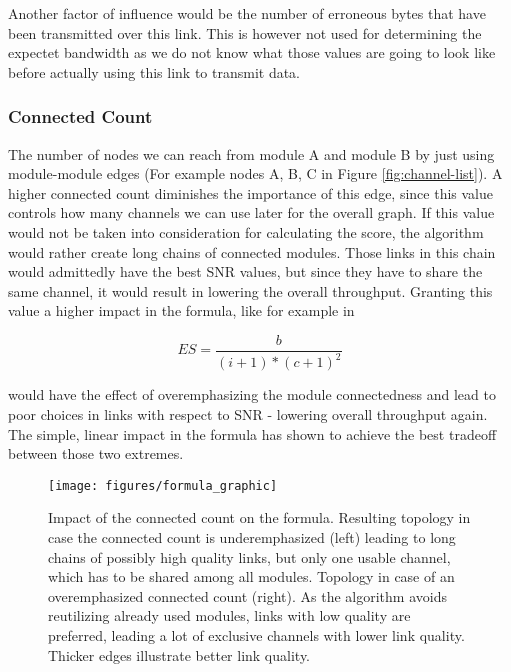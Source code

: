 	Another factor of influence would be the number of erroneous bytes that have been transmitted over this link. 
	This is however not used for determining the expectet bandwidth as we do not know what those values are going to look like before actually using this link to transmit data.

      \subsubsection{Connected Count}
	The number of nodes we can reach from module A and module B by just using module-module edges (For example nodes A, B, C in Figure \ref{fig:channel-list}). 
	A higher connected count diminishes the importance of this edge, since this value controls how many channels we can use later for the overall graph.
	If this value would not be taken into consideration for calculating the score, the algorithm would rather create long chains of connected modules. 
	Those links in this chain would admittedly have the best \ac{SNR} values, but since they have to share the same channel,  
	it would result in lowering the overall throughput.
	Granting this value a higher impact in the formula, like for example in 
	
	\begin{equation}
	  ES=\frac{b}{(i + 1)* (c + 1)^2}
	\end{equation}
	
	would have the effect of overemphasizing the module connectedness and lead to poor choices in links with respect to \ac{SNR} - 
	lowering overall throughput again.
	The simple, linear impact in the formula has shown to achieve the best tradeoff between those two extremes.
	
	\begin{figure}[h!]
	  \centering
	  \texttt{[image: figures/formula\_graphic]}
	  \caption{Impact of the connected count on the formula. Resulting topology in case the connected count is underemphasized (left) leading
	    to long chains of possibly high quality links, but only one usable channel, which has to be shared among all modules.
	    Topology in case of an overemphasized connected count (right).
	    As the algorithm avoids reutilizing already used modules, links with low quality are preferred,
	    leading a lot of exclusive channels with lower link quality.
	    Thicker edges illustrate better link quality.}
	  \label{fig:formula_graphic}
	\end{figure}

\newpage
	
